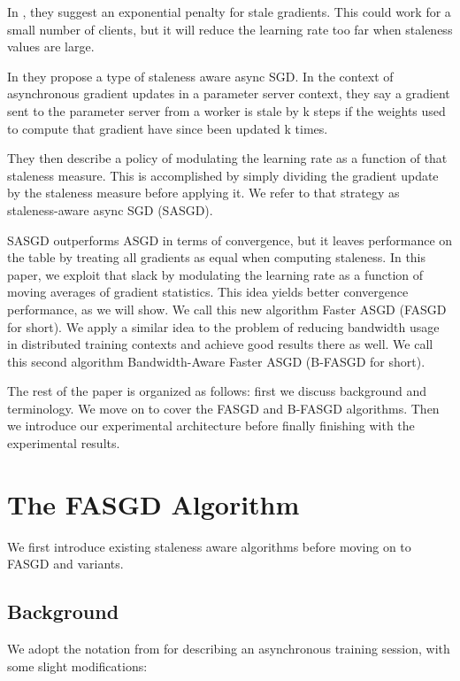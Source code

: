\documentclass{article} %
\begin{document}
In \cite{Rel}, they suggest an exponential penalty for stale gradients.
This could work for a small number of clients, but it will reduce the learning rate too far
when staleness values are large.

In \cite{Suyog} they propose a type of staleness aware async SGD.
In the context of asynchronous gradient updates in a parameter server context, they say a gradient
sent to the parameter server from a worker is stale by k steps if the weights used to compute that
gradient have since been updated k times.

They then describe a policy of modulating the learning rate as a function of that staleness measure.
This is accomplished by simply dividing the gradient update by the staleness measure before applying it.
We refer to that strategy as staleness-aware async SGD (SASGD).

SASGD outperforms ASGD in terms of convergence, but it leaves performance on the table by treating all gradients as equal when computing staleness.
In this paper, we exploit that slack by modulating the learning rate as a function of moving averages of gradient statistics.
This idea yields better convergence performance, as we will show. 
We call this new algorithm Faster ASGD (FASGD for short).
We apply a similar idea to the problem of reducing bandwidth usage in distributed training contexts and achieve good results there as well.
We call this second algorithm Bandwidth-Aware Faster ASGD (B-FASGD for short).

The rest of the paper is organized as follows: first we discuss background and terminology.
We move on to cover the FASGD and B-FASGD algorithms.
Then we introduce our experimental architecture before finally finishing with the experimental results.

\section{The FASGD Algorithm}

We first introduce existing staleness aware algorithms before moving on to FASGD and variants.

\subsection{Background}
We adopt the notation from \cite{Suyog} for describing an asynchronous training session,
with some slight modifications:
\end{document}
